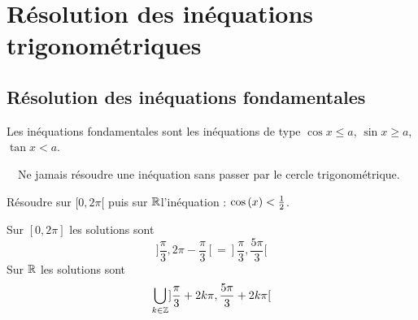 \documentclass[a4paper, 11pt]{article}
\begin{document}
%
%
%


%

%



\section{R\'esolution des in\'equations trigonom\'etriques}

\subsection{R\'esolution des in\'equations fondamentales}


\noindent Les in\'equations fondamentales sont les in\'equations de type $\cos{x}\leq a$, $\sin{x}\geq a$, $\tan{x}<a$.  \\

\setlength\fboxrule{1pt}
\noindent {}
\setlength\fboxrule{0.5pt}

\begin{rem}
\warning\, \, Ne jamais r\'esoudre une in\'equation sans passer par le cercle trigonom\'etrique.
\end{rem}



\begin{exemple}
R\'esoudre  sur $\lbrack 0,2\pi\lbrack$ puis sur $\mathbb{R}$l'in\'equation : $\cos{(x)}<\frac{1}{2}$.
\end{exemple}
\begin{cor}
Sur $[0,2\pi]$ les solutions sont $$]\frac{\pi}{3}, 2\pi-\frac{\pi}{3}[=]\frac{\pi}{3}, \frac{5\pi}{3}[$$
Sur $\mathbb{R}$ les solutions sont 
$$\displaystyle \bigcup_{k\in \mathbb{Z}} ]\frac{\pi}{3}+2k\pi, \frac{5\pi}{3}+2k\pi[$$

\end{cor}
\end{document}
